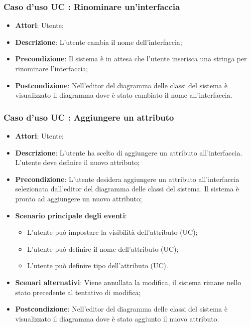 \documentclass[../AnalisiDeiRequisiti.tex]{subfiles}
\begin{document}
		\subsubsection{Caso d'uso UC : Rinominare un'interfaccia}
			\begin{itemize}
				\item \textbf{Attori}: Utente;
				\item \textbf{Descrizione}: L'utente cambia il nome dell'interfaccia;
				\item \textbf{Precondizione}: Il sistema è in attesa che l'utente inserisca
				una stringa per rinominare l'interfaccia;
				\item \textbf{Postcondizione}: Nell'editor del diagramma delle classi del
				sistema è visualizzato il diagramma dove è stato cambiato il nome
				all'interfaccia.
			\end{itemize}
		\subsubsection{Caso d'uso UC : Aggiungere un attributo}
			\begin{itemize}
				\item \textbf{Attori}: Utente;
				\item \textbf{Descrizione}: L'utente ha scelto di aggiungere un attributo
				all'interfaccia. L'utente deve definire il nuovo attributo;
				\item \textbf{Precondizione}: L'utente desidera aggiungere un attributo
				all'interfaccia selezionata dall'editor del diagramma delle classi del
				sistema. Il sistema è pronto ad aggiungere un nuovo attributo;
				\item \textbf{Scenario principale degli eventi}:
					\begin{itemize}
						\item L'utente può impostare la visibilità dell'attributo (UC);
						\item L'utente può definire il nome dell'attributo (UC);
						\item L'utente può definire tipo dell'attributo (UC).
					\end{itemize}
				\item \textbf{Scenari alternativi}: Viene annullata la modifica, il sistema
				rimane nello stato precedente al tentativo di modifica;
				\item \textbf{Postcondizione}: Nell'editor del diagramma delle classi del
				sistema è visualizzato il diagramma dove è stato aggiunto il nuovo attributo.
			\end{itemize}
\end{document}

